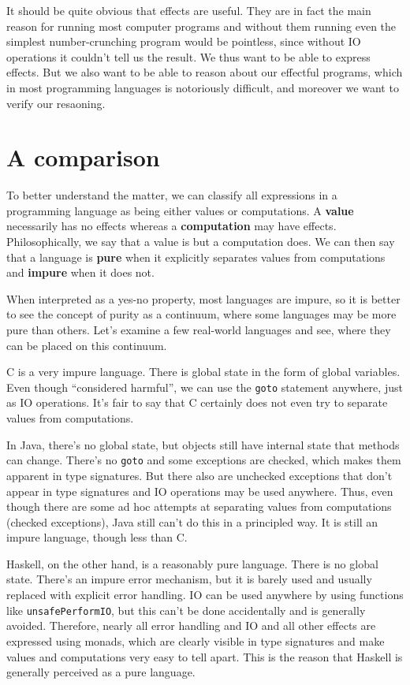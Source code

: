 \documentclass[declaration,inz,english,shortabstract]{iithesis}
\newcommand{\m}[1]{\texttt{#1}}
\begin{document}
It should be quite obvious that effects are useful. They are in fact the main reason for running most computer programs and without them running even the simplest number-crunching program would be pointless, since without IO operations it couldn't tell us the result. We thus want to be able to express effects. But we also want to be able to reason about our effectful programs, which in most programming languages is notoriously difficult, and moreover we want to verify our resaoning.

\section{A comparison}

To better understand the matter, we can classify all expressions in a programming language as being either values or computations. A \textbf{value} necessarily has no effects whereas a \textbf{computation} may have effects. Philosophically, we say that a value is but a computation does. We can then say that a language is \textbf{pure} when it explicitly separates values from computations and \textbf{impure} when it does not.

When interpreted as a yes-no property, most languages are impure, so it is better to see the concept of purity as a continuum, where some languages may be more pure than others. Let's examine a few real-world languages and see, where they can be placed on this continuum.

C is a very impure language. There is global state in the form of global variables. Even though ``considered harmful'', we can use the \m{goto} statement anywhere, just as IO operations. It's fair to say that C certainly does not even try to separate values from computations.

In Java, there's no global state, but objects still have internal state that methods can change. There's no \m{goto} and some exceptions are checked, which makes them apparent in type signatures. But there also are unchecked exceptions that don't appear in type signatures and IO operations may be used anywhere. Thus, even though there are some ad hoc attempts at separating values from computations (checked exceptions), Java still can't do this in a principled way. It is still an impure language, though less than C.

Haskell, on the other hand, is a reasonably pure language. There is no global state. There's an impure error mechanism, but it is barely used and usually replaced with explicit error handling. IO can be used anywhere by using functions like \m{unsafePerformIO}, but this can't be done accidentally and is generally avoided. Therefore, nearly all error handling and IO and all other effects are expressed using monads, which are clearly visible in type signatures and make values and computations very easy to tell apart. This is the reason that Haskell is generally perceived as a pure language.
\end{document}
